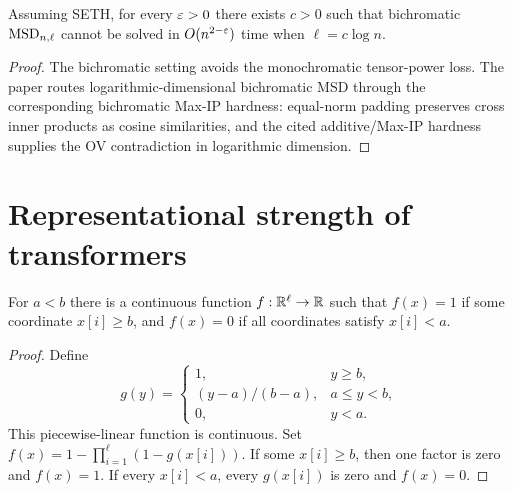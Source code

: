 \begin{theorem}
  \label{thm:intro-bichromatic-msd-hardness}
  Assuming SETH, for every $\varepsilon>0$ there exists $c>0$ such that bichromatic
  $\mathrm{MSD}_{n,\ell}$ cannot be solved in $O(n^{2-\varepsilon})$ time when $\ell=c\log n$.
\end{theorem}
\begin{proof}
  The bichromatic setting avoids the monochromatic tensor-power loss.  The
  paper routes logarithmic-dimensional bichromatic MSD through the corresponding
  bichromatic Max-IP hardness: equal-norm padding preserves cross inner products
  as cosine similarities, and the cited additive/Max-IP hardness supplies the
  OV contradiction in logarithmic dimension.
\end{proof}

\chapter{Representational strength of transformers}

\begin{lemma}
  \label{lem:continuous-threshold-or}
  For $a<b$ there is a continuous function $f:\mathbb{R}^\ell\to\mathbb{R}$ such that
  $f(x)=1$ if some coordinate $x[i]\geq b$, and $f(x)=0$ if all coordinates
  satisfy $x[i]<a$.
\end{lemma}
\begin{proof}
  Define
  \[
    g(y)=
    \begin{cases}
      1, & y\geq b,\\
      (y-a)/(b-a), & a\leq y<b,\\
      0, & y<a.
    \end{cases}
  \]
  This piecewise-linear function is continuous.  Set
  $f(x)=1-\prod_{i=1}^{\ell}(1-g(x[i]))$.  If some $x[i]\geq b$, then one
  factor is zero and $f(x)=1$.  If every $x[i]<a$, every $g(x[i])$ is zero and
  $f(x)=0$.
\end{proof}

